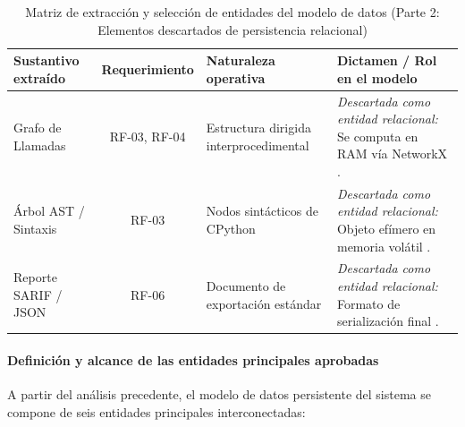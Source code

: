 \begin{table}[H]
\centering
\caption{Matriz de extracción y selección de entidades del modelo de datos (Parte 2: Elementos descartados de persistencia relacional)}
\label{p6:tab:extraccion_entidades_p2}
\small
{}
\begin{tabularx}{\textwidth}{p{3.2cm} c p{4.8cm} X}
\toprule
\textbf{Sustantivo extraído} & \textbf{Requerimiento} & \textbf{Naturaleza operativa} & \textbf{Dictamen / Rol en el modelo} \\
\midrule
Grafo de Llamadas & RF-03, RF-04 & Estructura dirigida interprocedimental & \textit{Descartada como entidad relacional:} Se computa en RAM vía NetworkX \cite{hagberg2008exploring}. \\
\addlinespace
Árbol AST / Sintaxis & RF-03 & Nodos sintácticos de CPython & \textit{Descartada como entidad relacional:} Objeto efímero en memoria volátil \cite{salis2021pycg}. \\
\addlinespace
Reporte SARIF / JSON & RF-06 & Documento de exportación estándar & \textit{Descartada como entidad relacional:} Formato de serialización final \cite{oasis2019sarif}. \\
\bottomrule
\end{tabularx}
\end{table}

\paragraph*{Definición y alcance de las entidades principales aprobadas}
A partir del análisis precedente, el modelo de datos persistente del sistema se compone de seis entidades principales interconectadas:

